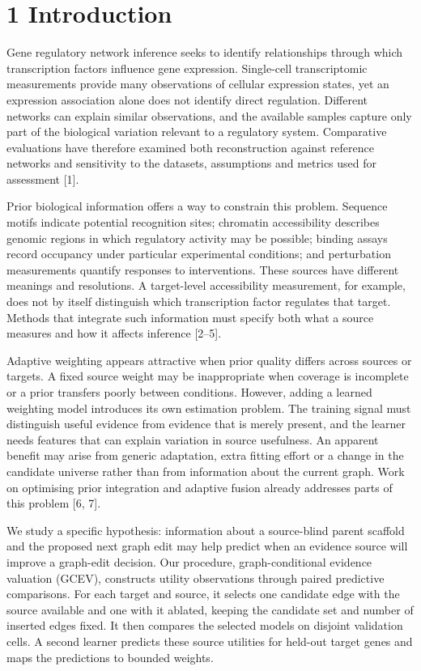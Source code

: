 \documentclass[
  11pt,
]{article}
\begin{document}
\section{1 Introduction}\label{introduction}

Gene regulatory network inference seeks to identify relationships
through which transcription factors influence gene expression.
Single-cell transcriptomic measurements provide many observations of
cellular expression states, yet an expression association alone does not
identify direct regulation. Different networks can explain similar
observations, and the available samples capture only part of the
biological variation relevant to a regulatory system. Comparative
evaluations have therefore examined both reconstruction against
reference networks and sensitivity to the datasets, assumptions and
metrics used for assessment {[}1{]}.

Prior biological information offers a way to constrain this problem.
Sequence motifs indicate potential recognition sites; chromatin
accessibility describes genomic regions in which regulatory activity may
be possible; binding assays record occupancy under particular
experimental conditions; and perturbation measurements quantify
responses to interventions. These sources have different meanings and
resolutions. A target-level accessibility measurement, for example, does
not by itself distinguish which transcription factor regulates that
target. Methods that integrate such information must specify both what a
source measures and how it affects inference {[}2--5{]}.

Adaptive weighting appears attractive when prior quality differs across
sources or targets. A fixed source weight may be inappropriate when
coverage is incomplete or a prior transfers poorly between conditions.
However, adding a learned weighting model introduces its own estimation
problem. The training signal must distinguish useful evidence from
evidence that is merely present, and the learner needs features that can
explain variation in source usefulness. An apparent benefit may arise
from generic adaptation, extra fitting effort or a change in the
candidate universe rather than from information about the current graph.
Work on optimising prior integration and adaptive fusion already
addresses parts of this problem {[}6, 7{]}.

We study a specific hypothesis: information about a source-blind parent
scaffold and the proposed next graph edit may help predict when an
evidence source will improve a graph-edit decision. Our procedure,
graph-conditional evidence valuation (GCEV), constructs utility
observations through paired predictive comparisons. For each target and
source, it selects one candidate edge with the source available and one
with it ablated, keeping the candidate set and number of inserted edges
fixed. It then compares the selected models on disjoint validation
cells. A second learner predicts these source utilities for held-out
target genes and maps the predictions to bounded weights.
\end{document}
